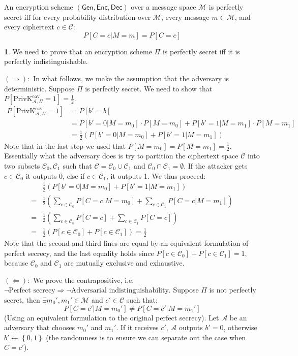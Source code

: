 \documentclass{article}
\theoremstyle{definition}
\newcommand{\set}[1]{\left\{#1\right\}}
\newcommand{\Gen}{\mathsf{Gen}}
\newcommand{\Enc}{\mathsf{Enc}}
\newcommand{\Dec}{\mathsf{Dec}}
\newcommand{\Ms}{\mathcal{M}} %
\newcommand{\Cs}{\mathcal{C}} %
\newcommand{\Adv}{\mathcal{A}} %
\newcommand{\priveav}{\text{PrivK}_{\mathcal{A},\Pi}^\text{eav}}
\theoremstyle{definition}
\theoremstyle{definition}
\newtheorem{solution-internal}{}[subsection]
\newenvironment{solution}{
  \begin{solution-internal}
}{
  \end{solution-internal}
}
\begin{document}
An encryption scheme $(\Gen, \Enc, \Dec)$ over a message space $\Ms$ is
perfectly secret iff for every probability distribution over $\Ms$, every
message $m \in \Ms$, and every ciphertext $c \in \Cs$:
\[ P[C = c | M = m] = P[C = c] \]

\begin{solution}
  We need to prove that an encryption scheme $\Pi$ is perfectly secret iff it is
  perfectly indistinguishable.
  \begin{item}
    \item[$(\Rightarrow):$] In what follows, we make the assumption that the
      adversary is deterministic. Suppose $\Pi$ is perfectly secret. We need
      to show that $P[\priveav = 1] = \frac{1}{2}$.
      \begin{align*}
        P[\priveav = 1] &= P[b' = b] \\
                        &= P[b' = 0|M = m_0] \cdot P[M=m_0] + P[b'=1|M = m_1]\cdot P[M=m_1] \\
                        &= \frac{1}{2} \left( P[b' = 0|M = m_0] + P[b'=1|M = m_1] \right)
      \end{align*}
      Note that in the last step we used that $P[M = m_0] = P[M = m_1] =
      \frac{1}{2}$. Essentially what the adversary does is try to partition the
      ciphertext space $\Cs$ into two subsets $\Cs_0, \Cs_1$ such that $\Cs =
      \Cs_0 \cup \Cs_1$ and $\Cs_0 \cap \Cs_1 = \emptyset$. If the attacker gets
      $c \in \Cs_0$ it outputs 0, else if $c \in \Cs_1$, it outputs 1. We thus
      proceed:
      \begin{align*}
        & \frac{1}{2}\left( P[b'=0|M=m_0] + P[b'=1|M=m_1]\right) \\
        =& \frac{1}{2}\left(\sum_{c \in \Cs_0} P[C=c|M=m_0] + \sum_{c \in \Cs_1} P[C=c|M=m_1]\right) \\
        =& \frac{1}{2}\left(\sum_{c \in \Cs_0} P[C=c] + \sum_{c \in \Cs_1} P[C=c]\right) \\
        =& \frac{1}{2}\left(P[c \in \Cs_0] + P[c \in \Cs_1]\right) = \frac{1}{2}
      \end{align*}
      Note that the second and third lines are equal by an equivalent
      formulation of perfect secrecy, and the last equality holds since $P[c \in
      \Cs_0] + P[c \in \Cs_1] = 1$, because $\Cs_0$ and $\Cs_1$ are mutually
      exclusive and exhaustive.
    \item[$(\Leftarrow):$] We prove the contrapositive, i.e.\ $\neg
      \text{Perfect secrecy} \Rightarrow \neg \text{Adversarial
      indistinguishability}$. Suppose $\Pi$ is not perfectly secret, then
      $\exists m_0',m_1' \in \Ms$ and $c' \in \Cs$ such that:
      \[ P[C=c'|M=m_0'] \neq P[C=c'|M=m_1'] \]
      (Using an equivalent formulation to the original perfect secrecy).
      Let $\Adv$ be an adversary that chooses $m_0'$ and $m_1'$. If it receives
      $c'$, $\Adv$ outputs $b'=0$, otherwise $b' \leftarrow \set{0,1}$ (the
      randomness is to ensure we can separate out the case when $C=c'$).


\end{item}
\end{solution}
\end{document}
